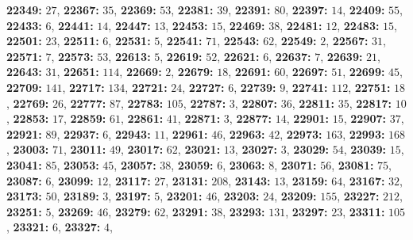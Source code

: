 \textsf{\bfseries 22349:} $27$, \textsf{\bfseries 22367:} $35$, \textsf{\bfseries 22369:} $53$, \textsf{\bfseries 22381:} $39$, \textsf{\bfseries 22391:} $80$, \textsf{\bfseries 22397:} $14$, \textsf{\bfseries 22409:} $55$, \textsf{\bfseries 22433:} $6$, \textsf{\bfseries 22441:} $14$, \textsf{\bfseries 22447:} $13$, \textsf{\bfseries 22453:} $15$, \textsf{\bfseries 22469:} $38$, \textsf{\bfseries 22481:} $12$, \textsf{\bfseries 22483:} $15$, \textsf{\bfseries 22501:} $23$, \textsf{\bfseries 22511:} $6$, \textsf{\bfseries 22531:} $5$, \textsf{\bfseries 22541:} $71$, \textsf{\bfseries 22543:} $62$, \textsf{\bfseries 22549:} $2$, \textsf{\bfseries 22567:} $31$, \textsf{\bfseries 22571:} $7$, \textsf{\bfseries 22573:} $53$, \textsf{\bfseries 22613:} $5$, \textsf{\bfseries 22619:} $52$, \textsf{\bfseries 22621:} $6$, \textsf{\bfseries 22637:} $7$, \textsf{\bfseries 22639:} $21$, \textsf{\bfseries 22643:} $31$, \textsf{\bfseries 22651:} $114$, \textsf{\bfseries 22669:} $2$, \textsf{\bfseries 22679:} $18$, \textsf{\bfseries 22691:} $60$, \textsf{\bfseries 22697:} $51$, \textsf{\bfseries 22699:} $45$, \textsf{\bfseries 22709:} $141$, \textsf{\bfseries 22717:} $134$, \textsf{\bfseries 22721:} $24$, \textsf{\bfseries 22727:} $6$, \textsf{\bfseries 22739:} $9$, \textsf{\bfseries 22741:} $112$, \textsf{\bfseries 22751:} $18$, \textsf{\bfseries 22769:} $26$, \textsf{\bfseries 22777:} $87$, \textsf{\bfseries 22783:} $105$, \textsf{\bfseries 22787:} $3$, \textsf{\bfseries 22807:} $36$, \textsf{\bfseries 22811:} $35$, \textsf{\bfseries 22817:} $10$, \textsf{\bfseries 22853:} $17$, \textsf{\bfseries 22859:} $61$, \textsf{\bfseries 22861:} $41$, \textsf{\bfseries 22871:} $3$, \textsf{\bfseries 22877:} $14$, \textsf{\bfseries 22901:} $15$, \textsf{\bfseries 22907:} $37$, \textsf{\bfseries 22921:} $89$, \textsf{\bfseries 22937:} $6$, \textsf{\bfseries 22943:} $11$, \textsf{\bfseries 22961:} $46$, \textsf{\bfseries 22963:} $42$, \textsf{\bfseries 22973:} $163$, \textsf{\bfseries 22993:} $168$, \textsf{\bfseries 23003:} $71$, \textsf{\bfseries 23011:} $49$, \textsf{\bfseries 23017:} $62$, \textsf{\bfseries 23021:} $13$, \textsf{\bfseries 23027:} $3$, \textsf{\bfseries 23029:} $54$, \textsf{\bfseries 23039:} $15$, \textsf{\bfseries 23041:} $85$, \textsf{\bfseries 23053:} $45$, \textsf{\bfseries 23057:} $38$, \textsf{\bfseries 23059:} $6$, \textsf{\bfseries 23063:} $8$, \textsf{\bfseries 23071:} $56$, \textsf{\bfseries 23081:} $75$, \textsf{\bfseries 23087:} $6$, \textsf{\bfseries 23099:} $12$, \textsf{\bfseries 23117:} $27$, \textsf{\bfseries 23131:} $208$, \textsf{\bfseries 23143:} $13$, \textsf{\bfseries 23159:} $64$, \textsf{\bfseries 23167:} $32$, \textsf{\bfseries 23173:} $50$, \textsf{\bfseries 23189:} $3$, \textsf{\bfseries 23197:} $5$, \textsf{\bfseries 23201:} $46$, \textsf{\bfseries 23203:} $24$, \textsf{\bfseries 23209:} $155$, \textsf{\bfseries 23227:} $212$, \textsf{\bfseries 23251:} $5$, \textsf{\bfseries 23269:} $46$, \textsf{\bfseries 23279:} $62$, \textsf{\bfseries 23291:} $38$, \textsf{\bfseries 23293:} $131$, \textsf{\bfseries 23297:} $23$, \textsf{\bfseries 23311:} $105$, \textsf{\bfseries 23321:} $6$, \textsf{\bfseries 23327:} $4$, 
